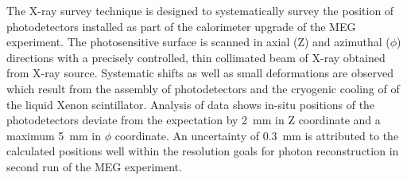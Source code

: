The X-ray survey technique is designed to systematically survey the position
of photodetectors installed as part of the calorimeter upgrade of the MEG experiment.
The photosensitive surface is scanned in axial (Z) and azimuthal ($\phi$) directions
with a precisely controlled, thin collimated beam of X-ray obtained from \cob X-ray source.
Systematic shifts as well as small deformations are observed 
which result from the assembly of photodetectors and the cryogenic cooling of
of the liquid Xenon scintillator. Analysis of data shows in-situ positions of the photodetectors
deviate from the expectation by 2~mm in Z coordinate and a maximum 5~mm in $\phi$
coordinate. An uncertainty of 0.3~mm is attributed to the calculated positions
well within the resolution goals for photon reconstruction in second run of the MEG experiment.
